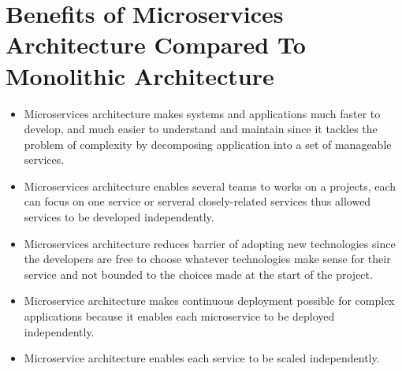 \documentclass[11pt,a4paper]{report}
\begin{document}
	\section{Benefits of Microservices Architecture Compared To Monolithic Architecture}
		\begin{itemize}
			\item Microservices architecture makes systems and applications much faster to develop, and much easier to understand and maintain since it tackles the problem of complexity by decomposing application into a set of manageable services.
			\item Microservices architecture enables several teams to works on a projects, each can focus on one service or serveral closely-related services thus allowed services to be developed independently. 
			\item  Microservices architecture reduces barrier of adopting new technologies since the developers are free to choose whatever technologies make sense for their service and not bounded to the choices made at the start of the project.
			\item Microservice architecture makes continuous deployment possible for complex applications because it enables each microservice to be deployed independently.
			\item Microservice architecture enables each service to be scaled independently.
		\end{itemize}
\end{document}
